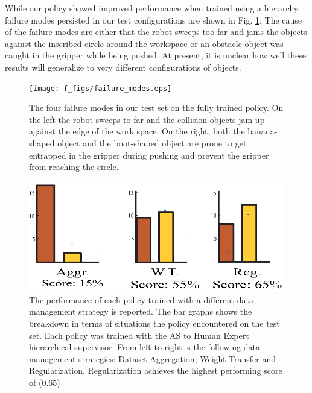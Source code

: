 \documentclass[10pt, conference]{ieeeconf}      %
\begin{document}
While our policy showed improved performance when trained using a hierarchy, failure modes persisted in our test
configurations are shown in Fig. \ref{fig:failure_modes}. The cause of the failure modes are either that the robot
sweeps too far and jams the objects against the inscribed circle around the workspace or an obstacle object was caught
in the gripper while being pushed. At present, it is unclear how well these results will generalize to very different configurations 
of objects.

\begin{figure}[t]
\centering 
\texttt{[image: f\_figs/failure\_modes.eps]}

\caption{\footnotesize The four failure modes in our test set on the fully trained policy. On the left the robot sweeps
to far and the collision objects jam up against the edge of the work space. On the right, both the banana-shaped object
and the boot-shaped object are prone to get entrapped in the gripper during pushing and prevent the gripper from reaching the circle.  }
\label{fig:failure_modes}
\end{figure}


\begin{figure}[t]
\centering 
\includegraphics{f_figs/cost_result.eps}

\caption{\footnotesize The performance of each policy trained with a different data management strategy is reported. The
bar graphs shows the breakdown in terms of situations the policy encountered on the test set. Each policy was trained
with the AS to Human Expert hierarchical supervisor. From left to right is the following data management strategies: Dataset Aggregation, Weight Transfer and Regularization. Regularization achieves the highest performing score of (0.65) }
\label{fig:cost_result}
\end{figure}
\end{document}
